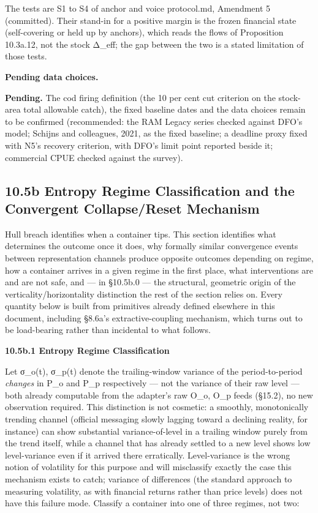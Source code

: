 \documentclass[
]{article}
\begin{document}
The tests are S1 to S4 of anchor and voice protocol.md, Amendment 5
(committed). Their stand-in for a positive margin is the frozen
financial state (self-covering or held up by anchors), which reads the
flows of Proposition 10.3a.12, not the stock Δ\_eff; the gap between the
two is a stated limitation of those tests.

\textbf{Pending data choices.}

\textbf{Pending.} The cod firing definition (the 10 per cent cut
criterion on the stock-area total allowable catch), the fixed baseline
dates and the data choices remain to be confirmed (recommended: the RAM
Legacy series checked against DFO's model; Schijns and colleagues, 2021,
as the fixed baseline; a deadline proxy fixed with N5's recovery
criterion, with DFO's limit point reported beside it; commercial CPUE
checked against the survey).

\hypertarget{b-entropy-regime-classification-and-the-convergent-collapsereset-mechanism}{%
\subsection{10.5b Entropy Regime Classification and the Convergent
Collapse/Reset
Mechanism}\label{b-entropy-regime-classification-and-the-convergent-collapsereset-mechanism}}

Hull breach identifies when a container tips. This section identifies
what determines the outcome once it does, why formally similar
convergence events between representation channels produce opposite
outcomes depending on regime, how a container arrives in a given regime
in the first place, what interventions are and are not safe, and --- in
§10.5b.0 --- the structural, geometric origin of the
verticality/horizontality distinction the rest of the section relies on.
Every quantity below is built from primitives already defined elsewhere
in this document, including §8.6a's extractive-coupling mechanism, which
turns out to be load-bearing rather than incidental to what follows.

\textbf{10.5b.1 Entropy Regime Classification}

Let σ\_o(t), σ\_p(t) denote the trailing-window variance of the
period-to-period \emph{changes} in P\_o and P\_p respectively --- not
the variance of their raw level --- both already computable from the
adapter's raw O\_o, O\_p feeds (§15.2), no new observation required.
This distinction is not cosmetic: a smoothly, monotonically trending
channel (official messaging slowly lagging toward a declining reality,
for instance) can show substantial variance-of-level in a trailing
window purely from the trend itself, while a channel that has already
settled to a new level shows low level-variance even if it arrived there
erratically. Level-variance is the wrong notion of volatility for this
purpose and will misclassify exactly the case this mechanism exists to
catch; variance of differences (the standard approach to measuring
volatility, as with financial returns rather than price levels) does not
have this failure mode. Classify a container into one of three regimes,
not two:
\end{document}
